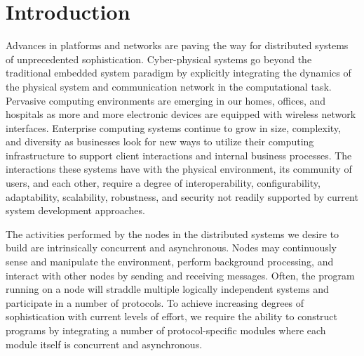 \section{Introduction\label{introduction}}

Advances in platforms and networks are paving the way for distributed systems of unprecedented sophistication.
Cyber-physical systems go beyond the traditional embedded system paradigm by explicitly integrating the dynamics of the physical system and communication network in the computational task.
Pervasive computing environments are emerging in our homes, offices, and hospitals as more and more electronic devices are equipped with wireless network interfaces.
Enterprise computing systems continue to grow in size, complexity, and diversity as businesses look for new ways to utilize their computing infrastructure to support client interactions and internal business processes.
The interactions these systems have with the physical environment, its community of users, and each other, require a degree of interoperability, configurability, adaptability, scalability, robustness, and security not readily supported by current system development approaches.

The activities performed by the nodes in the distributed systems we desire to build are intrinsically concurrent and asynchronous.
Nodes may continuously sense and manipulate the environment, perform background processing, and interact with other nodes by sending and receiving messages.
Often, the program running on a node will straddle multiple logically independent systems and participate in a number of protocols.
To achieve increasing degrees of sophistication with current levels of effort, we require the ability to construct programs by integrating a number of protocol-specific modules where each module itself is concurrent and asynchronous.



